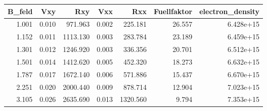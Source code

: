 \begin{tabular}{rrrrrrr}
\toprule
 B\_feld &    Vxy &       Rxy &    Vxx &       Rxx &  Fuellfaktor &  electron\_density \\
\midrule
  1.001 &  0.010 &   971.963 &  0.002 &   225.181 &       26.557 &         6.428e+15 \\
  1.152 &  0.011 &  1113.130 &  0.003 &   283.784 &       23.189 &         6.459e+15 \\
  1.301 &  0.012 &  1246.920 &  0.003 &   336.356 &       20.701 &         6.512e+15 \\
  1.501 &  0.014 &  1412.620 &  0.005 &   452.320 &       18.273 &         6.632e+15 \\
  1.787 &  0.017 &  1672.140 &  0.006 &   571.886 &       15.437 &         6.670e+15 \\
  2.251 &  0.020 &  2000.440 &  0.009 &   878.714 &       12.904 &         7.023e+15 \\
  3.105 &  0.026 &  2635.690 &  0.013 &  1320.560 &        9.794 &         7.353e+15 \\
\bottomrule
\end{tabular}
